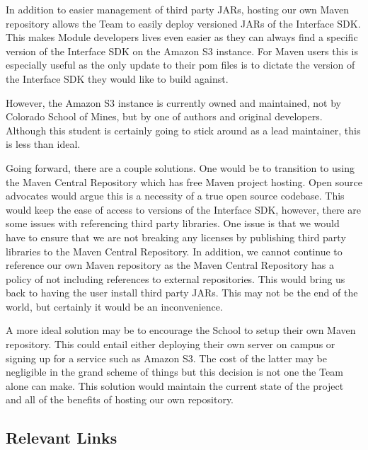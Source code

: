 \documentclass[11pt,letterpaper]{article}
\begin{document}
	In addition to easier management of third party JARs, hosting our own Maven
	repository allows the Team to easily deploy versioned JARs of the Interface
	SDK. This makes Module developers lives even easier as they can always find a
	specific version of the Interface SDK on the Amazon S3 instance. For Maven
	users this is especially useful as the only update to their pom files is to
	dictate the version of the Interface SDK they would like to build against.

	However, the Amazon S3 instance is currently owned and maintained, not by
	Colorado School of Mines, but by one of authors and original developers.
	Although this student is certainly going to stick around as a lead
	maintainer, this is less than ideal.

	Going forward, there are a couple solutions. One would be to transition to
	using the Maven Central Repository which has free Maven project hosting.  Open
	source advocates would argue this is a necessity of a true open source
	codebase.  This would keep the ease of access to versions of the Interface
	SDK, however, there are some issues with referencing third party libraries. One
	issue is that we would have to ensure that we are not breaking any licenses by
	publishing third party libraries to the Maven Central Repository. In addition,
	we cannot continue to reference our own Maven repository as the Maven Central
	Repository has a policy of not including references to external repositories.
	This would bring us back to having the user install third party JARs.  This
	may not be the end of the world, but certainly it would be an inconvenience.

	A more ideal solution may be to encourage the School to setup their own Maven
	repository.  This could entail either deploying their own server on campus or
	signing up for a service such as Amazon S3. The cost of the latter may be
	negligible in the grand scheme of things but this decision is not one the Team
	alone can make. This solution would maintain the current state of the project
	and all of the benefits of hosting our own repository.

	\pagebreak

	\subsection{Relevant Links}
	\label{sec:relevant_links}
\end{document}

